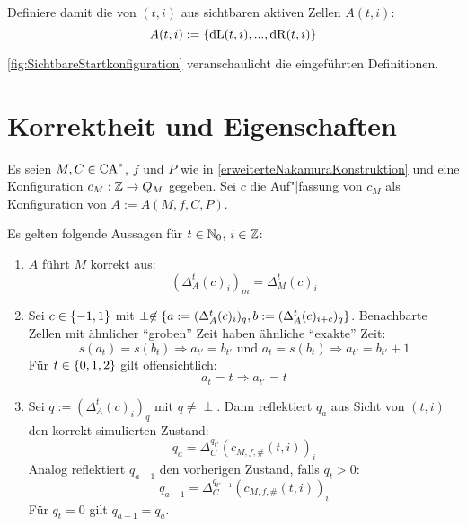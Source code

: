 \begin{definition}
    Definiere damit die von $(t, i)$ aus sichtbaren aktiven Zellen $A(t, i)$:
    \[
        A(t, i) := \{ { \mathrm{dL}(t, i), ..., \mathrm{dR}(t, i)} \}
    \]
    
    \cref{fig:SichtbareStartkonfiguration} veranschaulicht die eingeführten Definitionen.
\end{definition}

\section{Korrektheit und Eigenschaften}

\begin{satz}
    \label{nakamura_korrektheit}
    Es seien $M, C \in \textrm{CA}^*$, $f$ und $P$ wie in \cref{erweiterteNakamuraKonstruktion} und eine Konfiguration $c_M: \mathbb{Z} \to Q_M$ gegeben.
    Sei $c$ die Auf"|fassung von $c_M$ als Konfiguration von $A := A(M, f, C, P)$.
    
    Es gelten folgende Aussagen für $t \in \mathbb{N}_0$, $i \in \mathbb{Z}$:
    
    \begin{enumerate}
        \item
            $A$ führt $M$ korrekt aus:
            \[
                (\Delta_A^t(c)_i)_m = \Delta_M^t(c)_i
            \]
        \item
            Sei $c \in \{ {-1, 1} \}$ mit $\perp \not \in \{ {a := (\Delta_A^t(c)_i)_q, b := (\Delta_A^t(c)_{i+c})_q} \}$.
            Benachbarte Zellen mit ähnlicher \enquote{groben} Zeit haben ähnliche \enquote{exakte} Zeit:
            \[
                s(a_{t}) = s(b_{t}) \Rightarrow a_{t'} = b_{t'} \text{ und }  a_{t} = s(b_{t}) \Rightarrow a_{t'} = b_{t'} + 1
            \]
            Für $t \in \{ {0, 1, 2} \}$ gilt offensichtlich:
            \[
                a_{t} = t \Rightarrow a_{t'} = t
            \]
        \item
            Sei $q := (\Delta_A^t(c)_i)_q$ mit $q \neq \perp$.
            Dann reflektiert $q_a$ aus Sicht von $(t, i)$ den korrekt simulierten Zustand:
            \[
                q_a = \Delta_C^{q_{t'}}(c_{M, f, \#}(t, i))_i
            \]
            Analog reflektiert $q_{a-1}$ den vorherigen Zustand, falls $q_t > 0$:
            \[
                q_{a-1} = \Delta_C^{q_{t' - 1}}(c_{M, f, \#}(t, i))_i
            \]
            Für $q_t = 0$ gilt $q_{a-1} = q_a$.
    \end{enumerate}
\end{satz}
